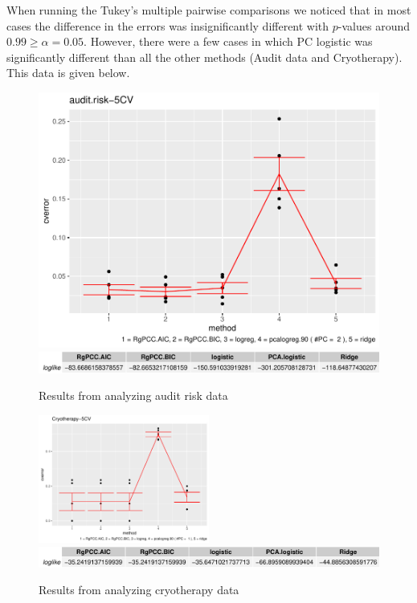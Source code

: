 \documentclass[main.tex]{subfiles}
\begin{document}
When running the Tukey's multiple pairwise comparisons we noticed that in most cases the difference in the errors was insignificantly different with $p$-values around $0.99 \geq \alpha = 0.05$. However, there were a few cases in which PC logistic was significantly different than all the other methods (Audit data and Cryotherapy). This data is given below.


\begin{figure}[H]
	\includegraphics[width = 0.5 \textwidth]{R-code/data/audit.risk-5CVgraph.pdf}
	\includegraphics[width = \textwidth]{R-code/data/audit.risk-5CVloglike.pdf}
	\label{fig:audit}
	\caption{Results from analyzing audit risk data}
\end{figure}

\begin{figure}[H]
    \centering

    \includegraphics[width = 0.5\textwidth]{R-code/data/Cryotherapy-5CVgraph.pdf}
    \includegraphics[width = \textwidth]{R-code/data/Cryotherapy-5CVloglike.pdf}
    \label{fig:cryo}
    \caption{Results from analyzing cryotherapy data}
\end{figure}
\end{document}
